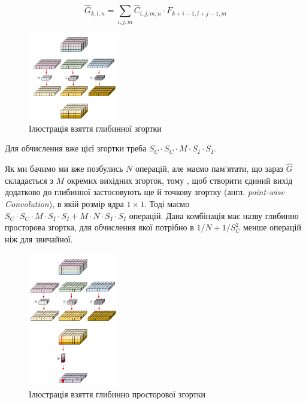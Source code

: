 \begin{equation}
    \widehat{G}_{k,l,n} = \sum_{i,j,m} \widehat{C}_{i,j,m,n} · F_{k+i-1, l+j-1,m}
    \label{eq:deep_wise_conv}
\end{equation}

\begin{figure}[H]
    \centering
    \includegraphics[width=0.35\textwidth]{images/cnn_deep_wise_conv}
    \caption{Ілюстрація взяття глибинної згортки  \cite{deep_wise_sep_conv_website}
        \label{fig:cnn:deep_wise_conv}
    }
\end{figure}

Для обчислення вже цієї згортки треба  $S_C · S_C · M · S_I · S_I$.

Як ми бачимо ми вже позбулись $N$ операцій, але маємо пам'ятати, що
зараз $\widehat{G}$ складається з $M$ окремих вихідних згорток, тому
, щоб створити єдиний вихід додатково до глибинної застосовують ще
й точкову згортку (англ. \textit{point-wise Convolution}), в якій розмір
ядра $1 \times 1$. Тоді маємо
$S_C · S_C · M · S_I · S_I + M · N · S_I · S_I$ операцій.
Дана комбінація має назву глибинно просторова згортка, для
обчислення якої потрібно в $1/N + 1/S_C^2$ менше операцій ніж
для звичайної.

\begin{figure}[H]
    \centering
    \includegraphics[width=0.35\textwidth]{images/cnn_deep_wise_separable_conv}
    \caption{Ілюстрація взяття глибинно просторової згортки  \cite{deep_wise_sep_conv_website}
        \label{fig:cnn:deep_wise_sep_conv}
    }
\end{figure}


